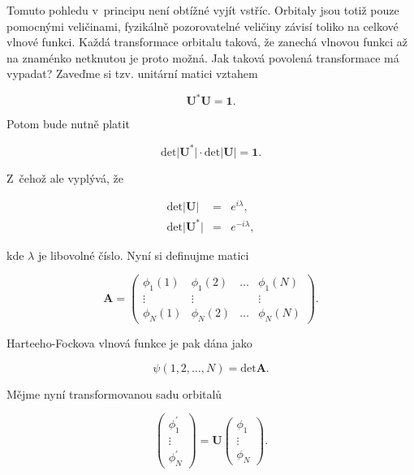 Tomuto pohledu v~principu není obtížné vyjít vstříc. Orbitaly jsou totiž pouze pomocnými veličinami, fyzikálně pozorovatelné veličiny závisí toliko na celkové vlnové funkci. Každá transformace orbitalu taková, že zanechá vlnovou funkci až na znaménko netknutou je proto možná. Jak taková povolená transformace má vypadat? Zaveďme si tzv. unitární matici vztahem

\begin{equation}
\mathbf{U}^{\ast} \mathbf{U} = \mathbf{1}.
\label{rov:ElStrukt-26}
\end{equation}

\noindent Potom bude nutně platit

\begin{equation}
\mbox{det} \vert \mathbf{U}^{\ast} \vert \cdot \mbox{det} \vert \mathbf{U} \vert = \mathbf{1}.
\label{rov:ElStrukt-27}
\end{equation}

\noindent Z~čehož ale vyplývá, že 

\begin{eqnarray}
\mbox{det} \vert \mathbf{U} \vert &=& e^{i\lambda}, \nonumber \\
\mbox{det} \vert \mathbf{U}^{\ast} \vert &=& e^{-i\lambda},
\label{rov:ElStrukt-28}
\end{eqnarray}


\noindent kde $\lambda$ je libovolné číslo. Nyní si definujme matici 


\begin{equation}
\mathbf{A}=
\begin{pmatrix}
\phi_1(1) & \phi_1(2) & \ldots & \phi_1(N) \\
\vdots & \vdots & & \vdots \\
\phi_N(1) & \phi_N (2) & \ldots & \phi_N(N)
\end{pmatrix}.
\label{rov:ElStrukt-29}
\end{equation}


\noindent Harteeho-Fockova vlnová funkce je pak dána jako


\begin{equation}
\psi(1,2, \dots, N) = \mbox{det} \mathbf{A}.
\label{rov:ElStrukt-30}
\end{equation}


\noindent Mějme nyní transformovanou sadu orbitalů


\begin{equation}
\begin{pmatrix}
\phi_1^{\prime} \\
\vdots \\
\phi_N^{\prime}
\end{pmatrix}
= \mathbf{U} 
\begin{pmatrix}
\phi_1 \\
\vdots \\
\phi_N
\end{pmatrix}.
\label{rov:ElStrukt-31}
\end{equation}



